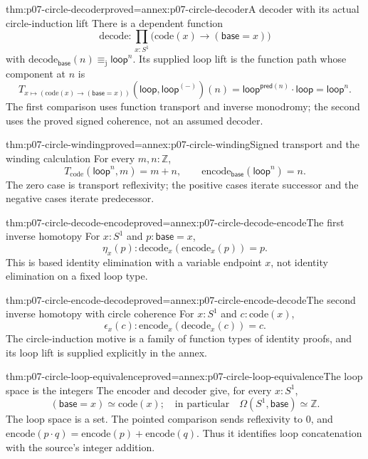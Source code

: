 \begin{hblemma}{thm:p07-circle-decoder}{proved=annex:p07-circle-decoder}{A decoder with its actual circle-induction lift}
There is a dependent function
\[
\mathrm{decode}:\prod_{x:S^1}
 \bigl(\mathrm{code}(x)\to(\mathsf{base}=x)\bigr)
\]
with \(\mathrm{decode}_{\mathsf{base}}(n)
\equiv_{\mathrm j}\mathsf{loop}^{n}\).
Its supplied loop lift is the function path whose component at \(n\) is
\[
T_{x\mapsto(\mathrm{code}(x)\to(\mathsf{base}=x))}
   (\mathsf{loop},\mathsf{loop}^{(-)})(n)
 =\mathsf{loop}^{\mathsf{pred}(n)}\cdot\mathsf{loop}
 =\mathsf{loop}^{n}.
\]
The first comparison uses function transport and inverse monodromy; the
second uses the proved signed coherence, not an assumed decoder.
\end{hblemma}

\begin{hblemma}{thm:p07-circle-winding}{proved=annex:p07-circle-winding}{Signed transport and the winding calculation}
For every \(m,n:\mathbb Z\),
\[
T_{\mathrm{code}}(\mathsf{loop}^{n},m)=m+n,\qquad
\mathrm{encode}_{\mathsf{base}}(\mathsf{loop}^{n})=n.
\]
The zero case is transport reflexivity; the positive cases iterate successor
and the negative cases iterate predecessor.
\end{hblemma}

\begin{hbtheorem}{thm:p07-circle-decode-encode}{proved=annex:p07-circle-decode-encode}{The first inverse homotopy}
For \(x:S^1\) and \(p:\mathsf{base}=x\),
\[
\eta_x(p):\mathrm{decode}_x(\mathrm{encode}_x(p))=p.
\]
This is based identity elimination with a variable endpoint \(x\), not
identity elimination on a fixed loop type.
\end{hbtheorem}

\begin{hbtheorem}{thm:p07-circle-encode-decode}{proved=annex:p07-circle-encode-decode}{The second inverse homotopy with circle coherence}
For \(x:S^1\) and \(c:\mathrm{code}(x)\),
\[
\epsilon_x(c):\mathrm{encode}_x(\mathrm{decode}_x(c))=c.
\]
The circle-induction motive is a family of function types of identity proofs,
and its loop lift is supplied explicitly in the annex.
\end{hbtheorem}

\begin{hbtheorem}{thm:p07-circle-loop-equivalence}{proved=annex:p07-circle-loop-equivalence}{The loop space is the integers}
The encoder and decoder give, for every \(x:S^1\),
\[
(\mathsf{base}=x)\simeq\mathrm{code}(x);
\quad\text{in particular}\quad
\Omega(S^1,\mathsf{base})\simeq\mathbb Z.
\]
The loop space is a set. The pointed comparison sends reflexivity to \(0\),
and \(\mathrm{encode}(p\cdot q)=\mathrm{encode}(p)+\mathrm{encode}(q)\).
Thus it identifies loop concatenation with the source's integer addition.
\end{hbtheorem}

